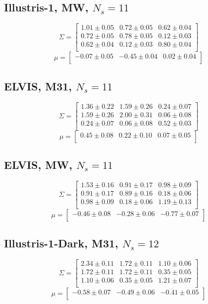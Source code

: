 \documentclass[a4paper,fleqn,usenatbib]{mnras}
\begin{document}
\subsection{Illustris-1, MW, $N_s=11$}
\[
\Sigma=
\begin{bmatrix}
1.01 \pm 0.05 & 0.72 \pm 0.05 & 0.62 \pm 0.04\\
0.72 \pm 0.05 & 0.78 \pm 0.05 & 0.12 \pm 0.03\\
0.62 \pm 0.04 & 0.12 \pm 0.03 & 0.80 \pm 0.04\\
\end{bmatrix}
\]
\[
\mu=
\begin{bmatrix}
-0.07 \pm 0.05 & -0.45 \pm 0.04 & 0.02 \pm 0.04\\
\end{bmatrix}
\]

\subsection{ELVIS, M31, $N_s=11$}
\[
\Sigma=
\begin{bmatrix}
1.36 \pm 0.22 & 1.59 \pm 0.26 & 0.24 \pm 0.07\\
1.59 \pm 0.26 & 2.00 \pm 0.31 & 0.06 \pm 0.08\\
0.24 \pm 0.07 & 0.06 \pm 0.08 & 0.52 \pm 0.03\\
\end{bmatrix}
\]
\[
\mu=
\begin{bmatrix}
0.45 \pm 0.08 & 0.22 \pm 0.10 & 0.07 \pm 0.05\\
\end{bmatrix}
\]
\subsection{ELVIS, MW, $N_s=11$}
\[
\Sigma=
\begin{bmatrix}
1.53 \pm 0.16 & 0.91 \pm 0.17 & 0.98 \pm 0.09\\
0.91 \pm 0.17 & 0.89 \pm 0.16 & 0.18 \pm 0.06\\
0.98 \pm 0.09 & 0.18 \pm 0.06 & 1.19 \pm 0.13\\
\end{bmatrix}
\]
\[
\mu=
\begin{bmatrix}
-0.46 \pm 0.08 & -0.28 \pm 0.06 & -0.77 \pm 0.07\\
\end{bmatrix}
\]

\subsection{Illustris-1-Dark, M31, $N_s=12$}
\[
\Sigma=
\begin{bmatrix}
2.34 \pm 0.11 & 1.72 \pm 0.11 & 1.10 \pm 0.06\\
1.72 \pm 0.11 & 1.72 \pm 0.11 & 0.35 \pm 0.05\\
1.10 \pm 0.06 & 0.35 \pm 0.05 & 1.21 \pm 0.07\\
\end{bmatrix}
\]
\[
\mu=
\begin{bmatrix}
-0.58 \pm 0.07 & -0.49 \pm 0.06 & -0.41 \pm 0.05\\
\end{bmatrix}
\]
\end{document}
